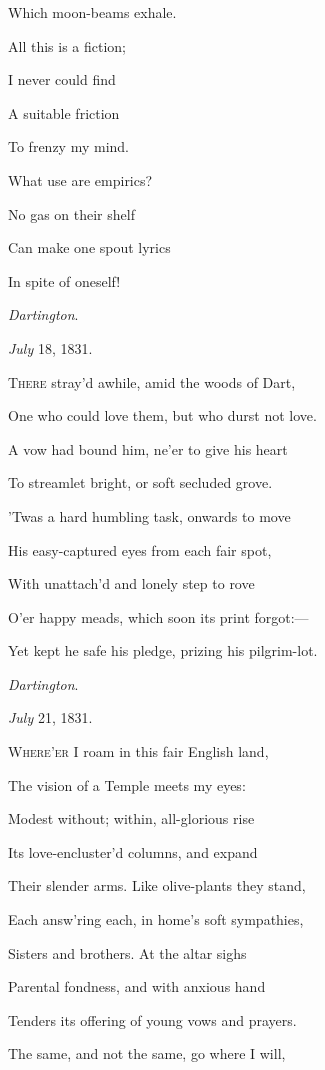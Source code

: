 Which moon-beams exhale.

All this is a fiction;

I never could find

A suitable friction

To frenzy my mind.

What use are empirics?

No gas on their shelf

Can make one spout lyrics

In spite of oneself!

\emph{Dartington}.

\emph{July} 18, 1831.


T\textsc{here} stray'd awhile, amid the woods of Dart,

One who could love them, but who durst not love.

A vow had bound him, ne'er to give his heart

To streamlet bright, or soft secluded grove.

'Twas a hard humbling task, onwards to move

His easy-captured eyes from each fair spot,

With unattach'd and lonely step to rove

O'er happy meads, which soon its print forgot:—

Yet kept he safe his pledge, prizing his pilgrim-lot.

\emph{Dartington}.

\emph{July} 21, 1831.


W\textsc{here'er} I roam in this fair English land,

The vision of a Temple meets my eyes:

Modest without; within, all-glorious rise

Its love-encluster'd columns, and expand

Their slender arms. Like olive-plants they stand,

Each answ'ring each, in home's soft sympathies,

Sisters and brothers. At the altar sighs

Parental fondness, and with anxious hand

Tenders its offering of young vows and prayers.

The same, and not the same, go where I will,

